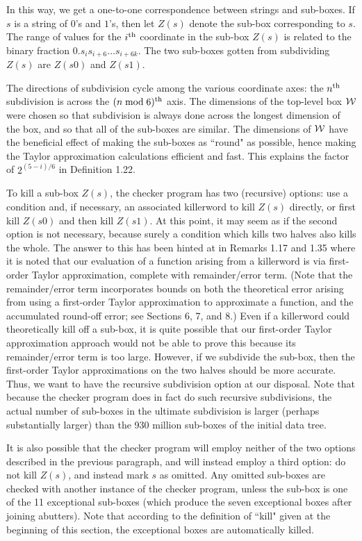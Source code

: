 In this way, we get a one-to-one correspondence
between strings and sub-boxes.
If $s$ is a string of $0$'s and $1$'s, then let $Z(s)$ denote
the sub-box corresponding to $s$.
The range of values for the $i^{\rm th}$ coordinate in the sub-box $Z(s)$ is related
to the binary fraction $0.s_{i}s_{i+6}\ldots s_{i+6k}$.
The two sub-boxes gotten from
subdividing $Z(s)$ are $Z(s0)$ and $Z(s1)$.

The directions of subdivision cycle among the various coordinate axes:
the $n^{\rm th}$ subdivision is across the $(n \bmod 6)^{\rm th}$ axis.
The dimensions of the top-level box ${\cal W}$ were chosen so that subdivision
is always done across the longest dimension of the box,
and so that all of the sub-boxes are similar.  
The dimensions of ${\cal W}$ have the beneficial effect of making the sub-boxes as ``round" as possible, hence making the Taylor approximation calculations efficient and fast.
This explains the factor of $2^{(5-i)/6}$ in Definition 1.22.

To kill a sub-box $Z(s)$, the checker program has two (recursive) options:
use a condition and, if necessary, an associated killerword  to kill $Z(s)$ directly, or first kill $Z(s0)$ and then kill $Z(s1)$.
At this point, it may seem as if the second option is not necessary,
because surely a condition which kills two halves also kills the whole.
The answer to this has been hinted at in Remarks 1.17 and 1.35 where
it is noted that our evaluation of a function arising
from a killerword  is via first-order Taylor
approximation, complete with remainder/error term.
(Note that the remainder/error term incorporates bounds on
both the theoretical error arising from using a first-order Taylor
approximation to approximate a function, and the accumulated
round-off error; see Sections 6, 7,  and 8.)
Even if a killerword could theoretically kill off a sub-box,
it is quite possible that our
first-order Taylor approximation approach would not be
able to prove this 
because its remainder/error term is too large.
However, if we subdivide the sub-box, then the first-order
Taylor approximations on the two halves should be more accurate.  
Thus,
we want to have the recursive subdivision option at our
disposal.
Note that because the checker program does in fact do such 
recursive subdivisions, the actual number of sub-boxes in the
ultimate subdivision is larger (perhaps substantially larger)
than the 930 million sub-boxes of the initial data tree.

It is also possible that the checker program will employ
neither of the two options described in the previous
paragraph, and will instead employ  
a third option: do not kill $Z(s)$, and instead
mark $s$ as omitted.
Any omitted sub-boxes are checked with another instance
of the checker program,
unless the sub-box is one of the 11 exceptional
sub-boxes (which produce the seven exceptional boxes after joining abutters).
Note that according to the definition of ``kill" given at the beginning of this section, the exceptional boxes are
automatically killed.   

